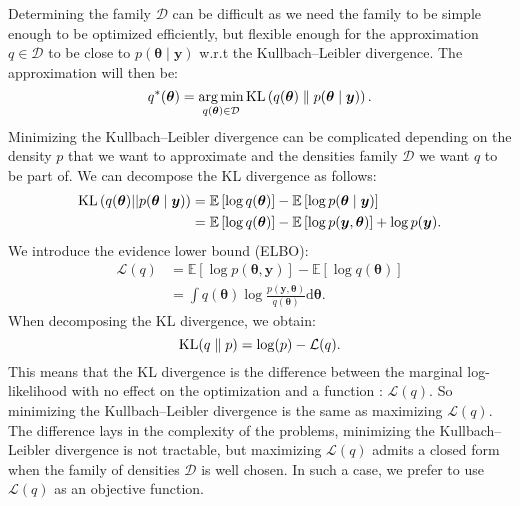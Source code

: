 \documentclass{article}
\numberwithin{equation}{section}
\DeclareMathOperator*{\argmin}{arg\,min}
\DeclareMathOperator*{\KL}{{\rm KL}}
\begin{document}
Determining the family $\mathcal{D}$ can be difficult as we need the family to be simple enough to be optimized efficiently, but flexible enough for the approximation $q \in \mathcal{D}$ to be close to $p(\boldsymbol{\theta} \mid \boldsymbol{y})$ w.r.t the Kullbach--Leibler divergence. The approximation will then be:
\begin{equation*}
q^*(\boldsymbol{\theta} ) = \argmin_{q(\boldsymbol{\theta}) \in \mathcal{D}} \KL\left( q(\boldsymbol{\theta}) \parallel p(\boldsymbol{\theta} \mid \boldsymbol{y})\right).
\end{equation*}
Minimizing the Kullbach--Leibler divergence can be complicated depending on the density $p$ that we want to approximate and the densities family $\mathcal{D}$ we want $q$ to be part of. We can decompose the KL divergence as follows:
\begin{align*}
\KL\left(q(\boldsymbol{\theta})||p(\boldsymbol{\theta}\mid \boldsymbol{y})\right) &= \mathbb{E}\left[\log q(\boldsymbol{\theta})\right] - \mathbb{E}\left[\log p(\boldsymbol{\theta}\mid \boldsymbol{y})\right]\\
&= \mathbb{E}\left[\log q(\boldsymbol{\theta})\right] - \mathbb{E}\left[\log p(\boldsymbol{y},\boldsymbol{\theta})\right] + \log p(\boldsymbol{y}).
\end{align*}
We introduce the evidence lower bound (\small{ELBO}):
\begin{align*}
\mathcal{L}(q) &= \mathbb{E}\left[\log p(\boldsymbol{\theta},\boldsymbol{y})\right] - \mathbb{E}\left[\log q(\boldsymbol{\theta})\right]\\
&=\int q(\boldsymbol{\theta})\log\frac{p(\boldsymbol{y},\boldsymbol{\theta})}{q(\boldsymbol{\theta})}\mathrm{d}\boldsymbol{\theta}.
\end{align*}
When decomposing the KL divergence, we obtain:
\begin{equation*}
\KL(q\parallel p) = \log(p) - \mathcal{L}(q).
\end{equation*}
This means that the KL divergence is the difference between the marginal log-likelihood with no effect on the optimization and a function : $\mathcal{L}(q)$. So minimizing the Kullbach--Leibler divergence is the same as maximizing $\mathcal{L}(q)$. The difference lays in the complexity of the problems, minimizing the Kullbach--Leibler divergence is not tractable, but maximizing $\mathcal{L}(q)$ admits a closed form when the family of densities $\mathcal{D}$ is well chosen. In such a case, we prefer to use $\mathcal{L}(q)$ as an objective function.
\end{document}
